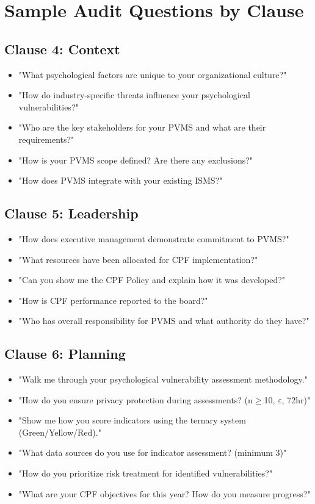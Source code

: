 \documentclass[11pt,a4paper]{article}
\begin{document}
\section{Sample Audit Questions by Clause}

\subsection{Clause 4: Context}

\begin{itemize}
\item "What psychological factors are unique to your organizational culture?"
\item "How do industry-specific threats influence your psychological vulnerabilities?"
\item "Who are the key stakeholders for your PVMS and what are their requirements?"
\item "How is your PVMS scope defined? Are there any exclusions?"
\item "How does PVMS integrate with your existing ISMS?"
\end{itemize}

\subsection{Clause 5: Leadership}

\begin{itemize}
\item "How does executive management demonstrate commitment to PVMS?"
\item "What resources have been allocated for CPF implementation?"
\item "Can you show me the CPF Policy and explain how it was developed?"
\item "How is CPF performance reported to the board?"
\item "Who has overall responsibility for PVMS and what authority do they have?"
\end{itemize}

\subsection{Clause 6: Planning}

\begin{itemize}
\item "Walk me through your psychological vulnerability assessment methodology."
\item "How do you ensure privacy protection during assessments? (n$\geq$10, $\varepsilon$, 72hr)"
\item "Show me how you score indicators using the ternary system (Green/Yellow/Red)."
\item "What data sources do you use for indicator assessment? (minimum 3)"
\item "How do you prioritize risk treatment for identified vulnerabilities?"
\item "What are your CPF objectives for this year? How do you measure progress?"
\end{itemize}
\end{document}
